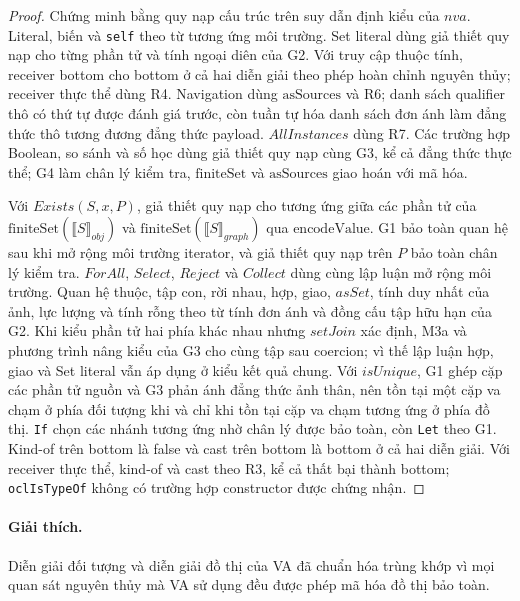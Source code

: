 \documentclass[11pt,a4paper]{article}
\theoremstyle{definition}
\newcommand{\finiteSet}{\mathrm{finiteSet}}
\newcommand{\asSources}{\mathrm{asSources}}
\newcommand{\encodeValue}{\mathrm{encodeValue}}
\newcommand{\sem}[2]{\llbracket #1 \rrbracket_{#2}}
\begin{document}
\begin{proof}
Chứng minh bằng quy nạp cấu trúc trên suy dẫn định kiểu của $nva$. Literal,
biến và \texttt{self} theo từ tương ứng môi trường. Set literal dùng giả thiết
quy nạp cho từng phần tử và tính ngoại diên của G2. Với truy cập thuộc tính,
receiver bottom cho bottom ở cả hai diễn giải theo phép hoàn chỉnh nguyên thủy;
receiver thực thể dùng R4. Navigation dùng $\asSources$ và R6; danh sách
qualifier thô có thứ tự được đánh giá trước, còn tuần tự hóa danh sách đơn ánh
làm đẳng thức thô tương đương đẳng thức payload. $AllInstances$ dùng R7. Các
trường hợp Boolean, so sánh và số học dùng giả thiết quy nạp cùng G3, kể cả đẳng
thức thực thể; G4 làm chân lý kiểm tra, $\finiteSet$ và $\asSources$ giao hoán
với mã hóa.

Với $Exists(S,x,P)$, giả thiết quy nạp cho tương ứng giữa các phần tử của
$\finiteSet(\sem{S}{obj})$ và $\finiteSet(\sem{S}{graph})$ qua
$\encodeValue$. G1 bảo toàn quan hệ sau khi mở rộng môi trường iterator, và giả
thiết quy nạp trên $P$ bảo toàn chân lý kiểm tra. $ForAll$, $Select$, $Reject$
và $Collect$ dùng cùng lập luận mở rộng môi trường. Quan hệ thuộc, tập con, rời
nhau, hợp, giao, $asSet$, tính duy nhất của ảnh, lực lượng và tính rỗng theo từ
tính đơn ánh và đồng cấu tập hữu hạn của G2. Khi kiểu phần tử hai phía khác
nhau nhưng $setJoin$ xác định, M3a và phương trình nâng kiểu của G3 cho cùng tập
sau coercion; vì thế lập luận hợp, giao và Set literal vẫn áp dụng ở kiểu kết
quả chung. Với $isUnique$, G1 ghép cặp các phần tử nguồn và G3 phản ánh đẳng
thức ảnh thân, nên tồn tại một cặp va chạm ở phía đối tượng khi và chỉ khi tồn
tại cặp va chạm tương ứng ở phía đồ thị.
\texttt{If} chọn các nhánh tương ứng nhờ chân lý được bảo toàn, còn
\texttt{Let} theo G1. Kind-of trên bottom là false và cast trên bottom là bottom
ở cả hai diễn giải. Với receiver thực thể, kind-of và cast theo R3, kể cả thất
bại thành bottom; \texttt{oclIsTypeOf} không có trường hợp constructor được
chứng nhận.
\end{proof}

\paragraph{Giải thích.}
Diễn giải đối tượng và diễn giải đồ thị của VA đã chuẩn hóa trùng khớp vì mọi
quan sát nguyên thủy mà VA sử dụng đều được phép mã hóa đồ thị bảo toàn.
\end{document}
